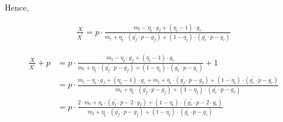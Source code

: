 \documentclass[american]{scrartcl}
\begin{document}
Hence,

\begin{equation}
    \begin{split}
        \frac{X}{X^\prime} = p \cdot \frac{m_t - \eta_t \cdot g_f + (\eta_t - 1) \cdot g_c}{m_t + \eta_t \cdot ( g^\prime_f \cdot p - g_f ) + (1 - \eta_t) \cdot (g^\prime_c \cdot p - g_c)}
    \end{split}
\end{equation}

\begin{equation}
    \begin{split}
        \frac{X}{X^\prime} + p &= p \cdot \frac{m_t - \eta_t \cdot g_f + (\eta_t - 1) \cdot g_c}{m_t + \eta_t \cdot ( g^\prime_f \cdot p - g_f ) + (1 - \eta_t) \cdot (g^\prime_c \cdot p - g_c)} + 1 \\
        &= p \cdot  \frac{m_t - \eta_t \cdot g_f + (\eta_t - 1) \cdot g_c + m_t + \eta_t \cdot ( g^\prime_f \cdot p - g_f ) + (1 - \eta_t) \cdot (g^\prime_c \cdot p - g_c)}{m_t + \eta_t \cdot ( g^\prime_f \cdot p - g_f ) + (1 - \eta_t) \cdot (g^\prime_c \cdot p - g_c)} \\
        &= p \cdot \frac{2 \cdot m_t + \eta_t \cdot (g^\prime_f \cdot p - 2\cdot g_f) + (1 - \eta_t) \cdot (g^\prime_c \cdot p - 2\cdot g_c)}{m_t + \eta_t \cdot ( g^\prime_f \cdot p - g_f ) + (1 - \eta_t) \cdot (g^\prime_c \cdot p - g_c)}
    \end{split}
\end{equation}

\end{document}

